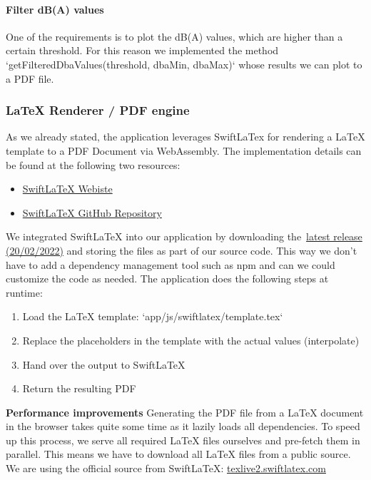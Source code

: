 \paragraph{Filter dB(A) values}
One of the requirements is to plot the dB(A) values, which are higher than a certain threshold.
For this reason we implemented the method `getFilteredDbaValues(threshold, dbaMin, dbaMax)` whose results we can plot to a PDF file.

\subsubsection{LaTeX Renderer / PDF engine}\label{subsubsec:latex-renderer-pdf-engine}
As we already stated, the application leverages SwiftLaTex for rendering a LaTeX template to a PDF Document via WebAssembly.
The implementation details can be found at the following two resources:

\begin{itemize}
    \item \href{https://www.swiftlatex.com/}{SwiftLaTeX Webiste}
    \item \href{https://github.com/SwiftLaTeX/SwiftLaTeX/}{SwiftLaTeX GitHub Repository}
\end{itemize}

We integrated SwiftLaTeX into our application by downloading the~\href{https://github.com/SwiftLaTeX/SwiftLaTeX/releases/tag/v20022022}{latest release (20/02/2022)}
and storing the files as part of our source code.
This way we don't have to add a dependency management tool such as npm and can we could customize the code as needed.
The application does the following steps at runtime:
\begin{enumerate}
    \item Load the LaTeX template: `app/js/swiftlatex/template.tex`
    \item Replace the placeholders in the template with the actual values (interpolate)
    \item Hand over the output to SwiftLaTeX
    \item Return the resulting PDF
\end{enumerate}

\textbf{Performance improvements}
Generating the PDF file from a LaTeX document in the browser takes quite some time as it lazily loads all dependencies.
To speed up this process, we serve all required LaTeX files ourselves and pre-fetch them in parallel.
This means we have to download all LaTeX files from a public source. We are using the official source from SwiftLaTeX:
\href{https://texlive2.swiftlatex.com/}{texlive2.swiftlatex.com}

